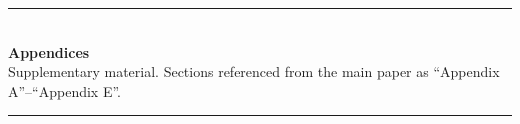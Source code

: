 \documentclass{article}
\begin{document}


\appendix
\newpage
\begin{center}
  \rule{0.5\linewidth}{0.4pt}\\[0.6em]
  {\Large\bfseries Appendices}\\[0.25em]
  {\small Supplementary material. Sections referenced from the main
   paper as ``Appendix A''--``Appendix E''.}\\[0.4em]
  \rule{0.5\linewidth}{0.4pt}
\end{center}
\vspace{0.5em}






\end{document}
